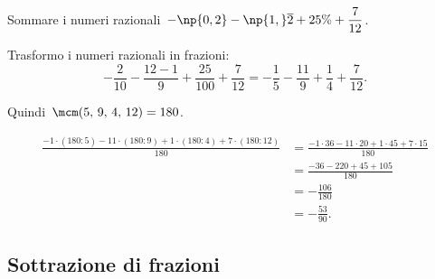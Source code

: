 \begin{exrig}
\begin{comment}
\paragraph*{Passo~$d$} per ogni frazione divido il~$\mcm$ per il suo denominatore e moltiplico il risultato
per il numeratore:
\begin{align*}
\frac{2\cdot(30:3)-5\cdot(30:6)+8\cdot(30:5)-1\cdot(30:1)}{30}&=
\frac{2\cdot10-5\cdot5+8\cdot6-1\cdot30}{30}\\
&=\frac{20-25+48-30}{30}
\end{align*}

\paragraph*{Passo~$e$} calcolo la somma algebrica dei numeri ottenuti al numeratore~$+13$
\paragraph*{Passo~$f$} metto la somma ottenuta al numeratore della frazione somma~$+\dfrac{13}{30}$
\paragraph*{Passo~$g$} vedo se posso ridurre la frazione, in questo caso no, il risultato è~$+\dfrac{13}{30}$.
\end{esempio}
\end{comment}
\begin{esempio}
Sommare i numeri razionali~$-\np{0,2}-\np{1,}\overline{2}+25\%+\dfrac{7}{12}$.

Trasformo i numeri razionali in frazioni: 
\[-\frac{2}{10}-\frac{12-1}{9}+\frac{25}{100}+\frac{7}{12}=-\frac{1}{5}-\frac{11}{9}+\frac{1}{4}+\frac{7}{12}.\]

Quindi~$\mcm(5\text{,~}9\text{,~}4\text{,~}12)=180$.

\begin{align*}
\frac{-1\cdot(180:5)-11\cdot(180:9)+1\cdot(180:4)+7\cdot(180:12)}{180}&=
\frac{-1\cdot36-11\cdot20+1\cdot45+7\cdot15}{180}\\
&=\frac{-36-220+45+105}{180}\\
&=-\frac{106}{180} \\
&=-\frac{53}{90}.
\end{align*}
\end{esempio}
\end{exrig}

\subsection{Sottrazione di frazioni}

